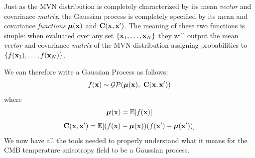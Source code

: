 Just as the MVN distribution is completely characterized by its mean \emph{vector} and covariance \emph{matrix}, the Gaussian process is completely specified by its mean and covariance \emph{functions} $\vb*{\mu}(\vb{x})$ and $\vb{C}(\vb{x}, \vb{x}')$. The meaning of these two functions is simple: when evaluated over any set $\{\vb{x}_1, \dots, \vb{x}_N\}$ they will output the mean \emph{vector} and covariance \emph{matrix} of the MVN distribution assigning probabilities to $\{f(\vb{x}_1), \dots, f(\vb{x}_N)\}$.

We can therefore write a Gaussian Process as follows: \cite{gaussian_processes_ml}
\begin{equation*}
    f(\vb{x}) \sim \mathcal{GP}(\vb*{\mu}(\vb{x}), \ \vb{C}(\vb{x}, \vb{x}'))
\end{equation*}
where
\begin{equation*}
    \vb*{\mu}(\vb{x}) = \mathbb{E}[f(\vb{x})]
\end{equation*}
\begin{equation*}
    \vb{C}(\vb{x}, \vb{x}') = \mathbb{E}[(f(\vb{x}) - \vb*{\mu}(\vb{x}))(f(\vb{x}') - \vb*{\mu}(\vb{x}'))]
\end{equation*}
We now have all the tools needed to properly understand what it means for the CMB temperature anisotropy field to be a Gaussian process.

